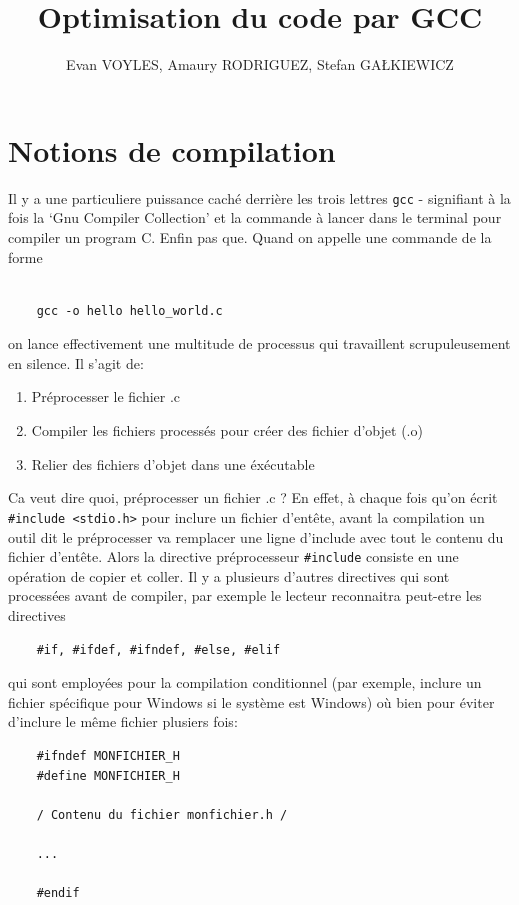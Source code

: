 \documentclass[11pt]{article} %
\title{Optimisation du code par GCC}
\author{Evan VOYLES, Amaury RODRIGUEZ, Stefan GA\L KIEWICZ}
\begin{document}
\maketitle

\section{Notions de compilation}
Il y a une particuliere puissance caché derrière les trois lettres \verb|gcc| - signifiant à la fois
la `Gnu Compiler Collection' et la commande à lancer dans le terminal pour compiler un program C. Enfin pas que.
Quand on appelle une commande de la forme
\begin{verbatim}

    gcc -o hello hello_world.c
\end{verbatim}
on lance effectivement une multitude de processus qui travaillent scrupuleusement en silence.
Il s'agit de:
\begin{enumerate}
    \item Préprocesser le fichier .c
    \item Compiler les fichiers processés pour créer des fichier d'objet (.o)
    \item Relier des fichiers d'objet dans une éxécutable
\end{enumerate}

Ca veut dire quoi, préprocesser un fichier .c ? En effet, à chaque fois qu'on
écrit \verb|#include <stdio.h>| pour inclure un fichier d'entête, avant la compilation
un outil dit le préprocesser va remplacer une ligne d'include avec tout le contenu du fichier d'entête.
Alors la directive préprocesseur \verb|#include| consiste en une opération de copier et coller. Il y a plusieurs d'autres directives qui sont processées avant de compiler,
par exemple le lecteur reconnaitra peut-etre les directives
\begin{verbatim}
    #if, #ifdef, #ifndef, #else, #elif
\end{verbatim}
qui sont employées
pour la compilation conditionnel (par exemple, inclure un fichier spécifique pour Windows si le système est Windows)
où bien pour éviter d'inclure le même fichier plusiers fois:
\begin{verbatim}
    #ifndef MONFICHIER_H
    #define MONFICHIER_H

    / Contenu du fichier monfichier.h /

    ...

    #endif
\end{verbatim}
\end{document}
